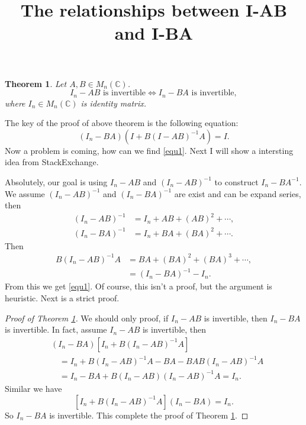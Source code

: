 \documentclass[a4paper,12pt]{article}
\title{The relationships between I-AB and I-BA}
\newtheorem{theorem}{Theorem}[section]
\theoremstyle{definition}
\begin{document}
\maketitle

\begin{theorem} \label{thm1}
    Let $ A, B \in M_n(\mathbb{C}) $.
    $$
        I_n-AB \text{ is invertible} \Longleftrightarrow I_n-BA \text{ is invertible},
    $$
    where $ I_n \in M_n(\mathbb{C}) $ is identity matrix.
\end{theorem}

The key of the proof of above theorem is the following equation:
\begin{equation} \label{equ1}
    (I_n - BA)(I + B (I - AB)^{-1} A) = I.
\end{equation}
Now a problem is coming, how can we find \eqref{equ1}. Next I will show a intersting idea from StackExchange.

Absolutely, our goal is using $ I_n-AB $ and $ (I_n-AB)^{-1} $ to construct $ {I_n - BA}^{-1} $.
We assume $ (I_n - AB)^{-1} $ and $ (I_n - BA)^{-1} $ are exist and can be expand series, then
\begin{align*}
    (I_n - AB)^{-1} &= I_n + AB + (AB)^2 + \cdots, \\
    (I_n - BA)^{-1} &= I_n + BA + (BA)^2 + \cdots.
\end{align*}
Then
\begin{align*}
    B(I_n - AB)^{-1}A &= BA + (BA)^2 + (BA)^3 + \cdots, \\
                      &= (I_n - BA)^{-1} - I_n.
\end{align*}
From this we get \eqref{equ1}. Of course, this isn't a proof, but the argument is heuristic. Next is a strict proof.

\begin{proof}[Proof of Theorem \ref{thm1}]
    We should only proof, if $ I_n-AB $ is invertible, then $ I_n-BA $ is invertible.
    In fact, assume $ I_n-AB $ is invertible, then
    \begin{align*}
        &(I_n - BA)[I_n + B (I_n - AB)^{-1} A] \\
            &\quad= I_n + B (I_n - AB)^{-1} A - BA - BAB (I_n - AB)^{-1} A \\
            &\quad= I_n - BA + B (I_n - AB) (I_n - AB)^{-1} A = I_n.
    \end{align*}
    Similar we have
    $$
        [I_n + B (I_n - AB)^{-1} A](I_n - BA) = I_n.
    $$
    So $ I_n-BA $ is invertible. This complete the proof of Theorem \ref{thm1}.
\end{proof}
\end{document}
